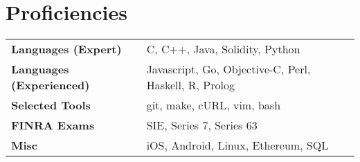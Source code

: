 \documentclass[letterpaper,11pt]{article}
\begin{document}
\section{Proficiencies}
\begin{tabularx}{\textwidth}{ X X }
  \textbf{Languages (Expert)} & C, C++, Java, Solidity, Python
  \\
  \textbf{Languages (Experienced)} & Javascript, Go, Objective-C, Perl, Haskell, R, Prolog
  \\
  \textbf{Selected Tools} & git, make, cURL, vim, bash
  \\
  \textbf{FINRA Exams} & SIE, Series 7, Series 63
  \\
  \textbf{Misc} & iOS, Android, Linux, Ethereum, SQL
\end{tabularx}

\end{document}
